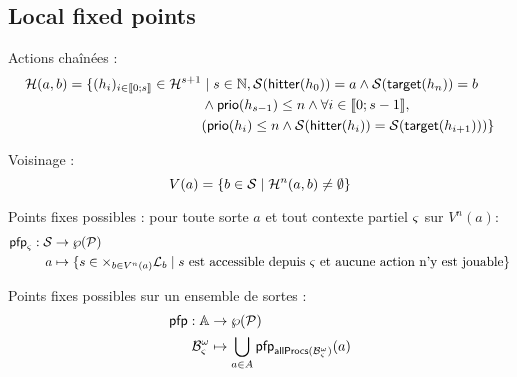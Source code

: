 \subsection{Local fixed points}
Actions chaînées :
\begin{align*}
\mathcal{H}(a, b) = \{ (h_i)_{i \in \llbracket 0; s \rrbracket} \in \mathcal{H}^{s+1} &\mid s \in \mathbb{N}, \mathcal{S}(\mathsf{hitter}(h_0)) = a \wedge \mathcal{S}(\mathsf{target}(h_n)) = b \\
  & \wedge \mathsf{prio}(h_{s-1}) \leq n \wedge \forall i \in \llbracket 0; s-1 \rrbracket, \\
  & (\mathsf{prio}(h_i) \leq n \wedge \mathcal{S}(\mathsf{hitter}(h_i)) = \mathcal{S}(\mathsf{target}(h_{i+1}))) \}
\end{align*}

Voisinage :
$$
V(a) = \{ b \in \mathcal{S} \mid \mathcal{H}^n(a, b) \neq \emptyset \}
$$

Points fixes possibles : pour toute sorte $a$ et tout contexte partiel $\varsigma$ sur $V^n(a)$:
\begin{align*}
  \mathsf{pfp}_\varsigma: \mathcal{S} &\rightarrow \wp(\mathcal{P}) \\
  a &\mapsto \{ s \in \times_{b \in V^n(a)} \mathcal{L}_b \mid \text{$s$ est accessible depuis $\varsigma$ et aucune action n'y est jouable} \}
\end{align*}

Points fixes possibles sur un ensemble de sortes :
\begin{align*}
  \mathsf{pfp}: \mathbb{A} &\rightarrow \wp(\mathcal{P}) \\
  \mathcal{B}^\omega_\varsigma &\mapsto \bigcup_{a \in A} \mathsf{pfp}_{\mathsf{allProcs}(\mathcal{B}^\omega_\varsigma)}(a)
\end{align*}

\begin{comment}
Séquences de bonds abstraites :
$$\BS^\wedge(P) = \{ \zeta^\wedge \mid \zeta \in \BS(P), \nexists \zeta' \in \BS(P), \zeta'^\wedge \subsetneq \zeta^\wedge \}$$
where $\zeta^\wedge = (\zeta^\wedge_A, \zeta^\wedge_B, \zeta^\wedge_{max})$ with:
\begin{itemize}
  \item $\zeta^\wedge_A = \{ \PHhitter(\zeta_n) \mid n \in \indexes{\zeta} \wedge \PHsort(\PHhitter(\zeta_n)) \neq \PHsort(P) \}$ : ens. des requis d'autres sortes (frappeurs)
  \item $\zeta^\wedge_B = \{ \PHhitter(\zeta_n) \mid n \in \indexes{\zeta} \} \cup \{ \PHtarget(\zeta_n) \mid n \in \indexes{\zeta} \}$ : ens. des processus nécessaires (à ne pas perturber)
  \item $\zeta^\wedge_{max} = \max_{n \in \indexes{\zeta}}(\prio(\zeta_n))$ : plus faible priorité
\end{itemize}
\end{comment}

